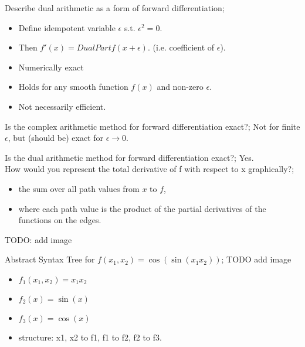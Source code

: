 \documentclass{article}
\begin{document}
Describe dual arithmetic as a form of forward differentiation; \begin{itemize} \item Define idempotent variable $\epsilon$ s.t. $\epsilon^2 = 0$.  \item Then $f'(x) = DualPartf(x+\epsilon)$. (i.e. coefficient of $\epsilon$).  \item Numerically exact \item Holds for any smooth function $f(x)$ and non-zero $\epsilon$.  \item Not necessarily efficient.  \end{itemize}

Is the complex arithmetic method for forward differentiation exact?; Not for finite $\epsilon$, but (should be) exact for $\epsilon\rightarrow 0$.

Is the dual arithmetic method for forward differentiation exact?; Yes.\\

How would you represent the total derivative of f with respect to x graphically?; \begin{itemize} \item the sum over all path values from $x$ to $f$, \item where each path value is the product of the partial derivatives of the functions on the edges.  \end{itemize} TODO: add image

Abstract Syntax Tree for $f(x_1, x_2)=\cos(\sin(x_1x_2))$; TODO add image \begin{itemize} \item $f_1(x_1,x_2)=x_1x_2$ \item $f_2(x)=\sin(x)$ \item $f_3(x) = \cos(x)$ \item structure: x1, x2 to f1, f1 to f2, f2 to f3.  \end{itemize}
\end{document}
